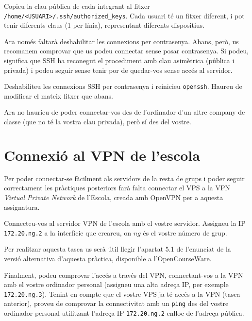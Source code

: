 \documentclass{practicaitic}
\begin{document}
\begin{previ}
Copieu la clau pública de cada integrant al fitxer
\texttt{/home/<USUARI>/.ssh/authorized\_keys}. Cada usuari té un fitxer diferent,
i pot tenir diferents claus (1 per línia), representant diferents dispositius.
\end{previ}

Ara només faltarà deshabilitar les connexions per contrasenya. Abans,
però, us recomanem comprovar que us podeu connectar sense posar
contrasenya. Si podeu, significa que SSH ha reconegut el procediment
amb clau asimètrica (pública i privada) i podeu seguir sense tenir por
de quedar-vos sense accés al servidor.

\begin{previ}
Deshabiliteu les connexions SSH per contrasenya i reinicieu \texttt{openssh}.
Haureu de modificar el mateix fitxer que abans.

Ara no hauríeu de poder connectar-vos des de l'ordinador d'un altre company
de classe (que no té la vostra clau privada), però sí des del vostre.
\end{previ}

\section{Connexió al VPN de l'escola}

Per poder connectar-se fàcilment als servidors de la resta de grups i
poder seguir correctament les pràctiques posteriors farà falta
connectar el VPS a la VPN \emph{Virtual Private Network} de l'Escola,
creada amb OpenVPN per a aquesta assignatura.

\begin{previ}
  Connecteu-vos al servidor VPN de l'escola amb el vostre servidor.
  Assigneu la IP \texttt{172.20.ng.2} a la interfície que creareu, on $ng$ és
  el vostre número de grup.

  Per realitzar aquesta tasca us serà útil llegir l'apartat 5.1 de l'enunciat de
  la versió alternativa d'aquesta pràctica, disponible a l'OpenCourseWare.
\end{previ}

Finalment, podeu comprovar l'accés a través del VPN, connectant-vos a
la VPN amb el vostre ordinador personal (assigneu una alta adreça IP,
per exemple \texttt{172.20.ng.3}). Tenint en compte que el vostre VPS
ja té accés a la VPN (tasca anterior), proveu de comprovar la
connectivitat amb un \texttt{ping} des del vostre ordinador personal
utilitzant l'adreça IP \texttt{172.20.ng.2} enlloc de l'adreça
pública.
\end{document}
